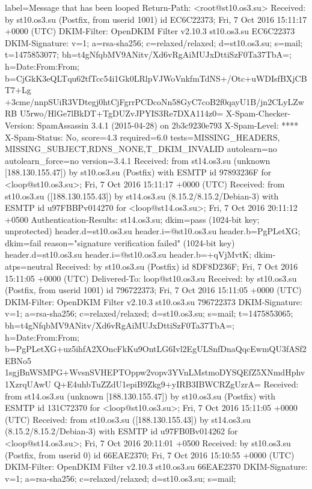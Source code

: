 \documentclass[a4paper,11pt]{article}
\begin{document}
\begin{bashcode*}{label=Message that has been looped}
Return-Path: <root@st10.os3.su>
Received: by st10.os3.su (Postfix, from userid 1001)
  id EC6C22373; Fri,  7 Oct 2016 15:11:17 +0000 (UTC)
DKIM-Filter: OpenDKIM Filter v2.10.3 st10.os3.su EC6C22373
DKIM-Signature: v=1; a=rsa-sha256; c=relaxed/relaxed; d=st10.os3.su; s=mail;
  t=1475853077; bh=t4gNfqbMV9ANitv/Xd6vRgAiMUJxDttiSzF0Ta37TbA=;
  h=Date:From:From;
  b=CjGkK3eQLTqu62tfTcc54i1Gk0LRlpVJWoVnkfmTdNS+/Otc+uWDIsfBXjCBT7+Lg
   +3cme/nnpSUiR3VDtegj0htCjFgrrPCDcoNn58GyC7coB2f0qayU1B/jn2CLyLZwRB
   U5rwo/HlGe7lBkDT+TgDUZvJPYIS3Re7DXA114z0=
X-Spam-Checker-Version: SpamAssassin 3.4.1 (2015-04-28) on 2b3c9230e793
X-Spam-Level: ****
X-Spam-Status: No, score=4.3 required=6.0 tests=MISSING_HEADERS,
  MISSING_SUBJECT,RDNS_NONE,T_DKIM_INVALID autolearn=no autolearn_force=no
  version=3.4.1
Received: from st14.os3.su (unknown [188.130.155.47])
  by st10.os3.su (Postfix) with ESMTP id 97893236F
  for <loop@st10.os3.su>; Fri,  7 Oct 2016 15:11:17 +0000 (UTC)
Received: from st10.os3.su ([188.130.155.43])
  by st14.os3.su (8.15.2/8.15.2/Debian-3) with ESMTP id u97FBBPv014270
  for <loop@st14.os3.su>; Fri, 7 Oct 2016 20:11:12 +0500
Authentication-Results: st14.os3.su;
  dkim=pass (1024-bit key; unprotected) header.d=st10.os3.su header.i=@st10.os3.su header.b=PgPLetXG;
  dkim=fail reason="signature verification failed" (1024-bit key) header.d=st10.os3.su header.i=@st10.os3.su header.b=+qVjMvtK;
  dkim-atps=neutral
Received: by st10.os3.su (Postfix)
  id 8DF8D236F; Fri,  7 Oct 2016 15:11:05 +0000 (UTC)
Delivered-To: loop@st10.os3.su
Received: by st10.os3.su (Postfix, from userid 1001)
  id 796722373; Fri,  7 Oct 2016 15:11:05 +0000 (UTC)
DKIM-Filter: OpenDKIM Filter v2.10.3 st10.os3.su 796722373
DKIM-Signature: v=1; a=rsa-sha256; c=relaxed/relaxed; d=st10.os3.su; s=mail;
  t=1475853065; bh=t4gNfqbMV9ANitv/Xd6vRgAiMUJxDttiSzF0Ta37TbA=;
  h=Date:From:From;
  b=PgPLetXG+uz5ihfA2XOncFkKu9OntLG6Ivl2EgULSnfDnaQqcEwmQU3fASf2EBNo5
   1sgjBnWSMPG+WvsnSVHEPTOppw2vopv3YVnLMstmoDYSQEfZ5XNmdHphv1XzrqUAwU
   Q+E4uhbTuZZdU1epiB9Zkg9+yIRB3IBWCRZgUzrA=
Received: from st14.os3.su (unknown [188.130.155.47])
  by st10.os3.su (Postfix) with ESMTP id 131C72370
  for <loop@st10.os3.su>; Fri,  7 Oct 2016 15:11:05 +0000 (UTC)
Received: from st10.os3.su ([188.130.155.43])
  by st14.os3.su (8.15.2/8.15.2/Debian-3) with ESMTP id u97FB0Bv014262
  for <loop@st14.os3.su>; Fri, 7 Oct 2016 20:11:01 +0500
Received: by st10.os3.su (Postfix, from userid 0)
  id 66EAE2370; Fri,  7 Oct 2016 15:10:55 +0000 (UTC)
DKIM-Filter: OpenDKIM Filter v2.10.3 st10.os3.su 66EAE2370
DKIM-Signature: v=1; a=rsa-sha256; c=relaxed/relaxed; d=st10.os3.su; s=mail;

\end{bashcode*}
\end{document}
